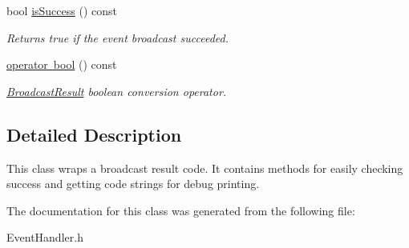 \begin{DoxyCompactItemize}
\mbox{\label{class_arcana_1_1_event_handler_1_1_broadcast_result_a8cdcee2a9e472031049b568bbb2bc726}} 
bool \mbox{\hyperlink{class_arcana_1_1_event_handler_1_1_broadcast_result_a8cdcee2a9e472031049b568bbb2bc726}{is\+Success}} () const
\begin{DoxyCompactList}\small\item\em Returns true if the event broadcast succeeded. \end{DoxyCompactList}\item 
\mbox{\label{class_arcana_1_1_event_handler_1_1_broadcast_result_a1ad6bfe1a44e76108f93e3485a1c6a10}} 
\mbox{\hyperlink{class_arcana_1_1_event_handler_1_1_broadcast_result_a1ad6bfe1a44e76108f93e3485a1c6a10}{operator bool}} () const
\begin{DoxyCompactList}\small\item\em \mbox{\hyperlink{class_arcana_1_1_event_handler_1_1_broadcast_result}{Broadcast\+Result}} boolean conversion operator. \end{DoxyCompactList}\end{DoxyCompactItemize}


\subsection{Detailed Description}
This class wraps a broadcast result code. It contains methods for easily checking success and getting code strings for debug printing. 

The documentation for this class was generated from the following file\+:\begin{DoxyCompactItemize}
\item 
Event\+Handler.\+h\end{DoxyCompactItemize}

